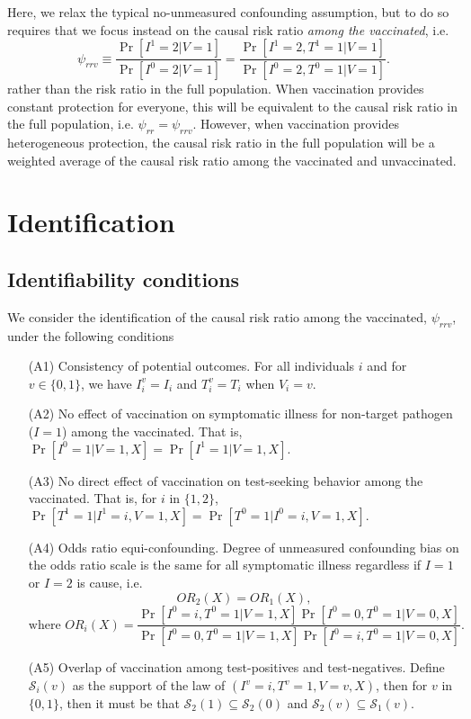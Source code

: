 \documentclass[11pt]{article}
\begin{document}
Here, we relax the typical no-unmeasured confounding assumption, but to do so requires that we focus instead on the causal risk ratio \textit{among the vaccinated}, i.e.
\begin{equation*}
    \psi_{rrv} \equiv \dfrac{\Pr[I^1 = 2 | V = 1]}{\Pr[I^0 = 2 | V = 1]} = \dfrac{\Pr[I^1 = 2, T^1 = 1 | V = 1]}{\Pr[I^0 = 2, T^0 = 1 | V = 1]}.
\end{equation*}
rather than the risk ratio in the full population. When vaccination provides constant protection for everyone, this will be equivalent to the causal risk ratio in the full population, i.e. $\psi_{rr} = \psi_{rrv}$. However, when vaccination provides heterogeneous protection, the causal risk ratio in the full population will be a weighted average of the causal risk ratio among the vaccinated and unvaccinated.

\section{Identification} \label{sec:identification}
\subsection{Identifiability conditions} \label{sec:conditions}
We consider the identification of the causal risk ratio among the vaccinated, $\psi_{rrv}$, under the following conditions
\begin{itemize}
    \item[(A1)] Consistency of potential outcomes. For all individuals $i$ and for $v \in \{0, 1\}$, we have $I_i^v = I_i$ and $T_i^v = T_i$ when $V_i = v$.
    \item[(A2)] No effect of vaccination on symptomatic illness for non-target pathogen ($I = 1$) among the vaccinated. That is, $\Pr[I^0 = 1 | V = 1, X] = \Pr[I^1 = 1 | V = 1, X].$
    \item[(A3)] No direct effect of vaccination on test-seeking behavior among the vaccinated. That is, for $i$ in $\{1,2\}$, $\Pr[T^1 = 1 | I^1 = i, V = 1, X] = \Pr[T^0 = 1 | I^0 = i, V = 1, X].$
    \item[(A4)] Odds ratio equi-confounding. Degree of unmeasured confounding bias on the odds ratio scale is the same for all symptomatic illness regardless if $I=1$ or $I=2$ is cause, i.e. 
    $$OR_2(X) = OR_1(X), $$
    $$ \text{where } OR_i(X) = \frac{\Pr[I^0 = i, T^0 = 1 | V = 1, X]\Pr[I^0 = 0, T^0 = 1 | V = 0, X]}{\Pr[I^0 = 0, T^0 = 1 | V = 1, X]\Pr[I^0 = i, T^0 = 1| V = 0, X]}.$$
    \item[(A5)] Overlap of vaccination among test-positives and test-negatives. Define $\mathcal{S}_i(v)$ as the support of the law of $(I^v = i, T^v = 1, V = v, X)$, then for $v$ in $\{0,1\}$, then it must be that $\mathcal{S}_2(1) \subseteq \mathcal{S}_2(0)$ and $\mathcal{S}_2(v) \subseteq \mathcal{S}_1(v).$
\end{itemize}
\end{document}
